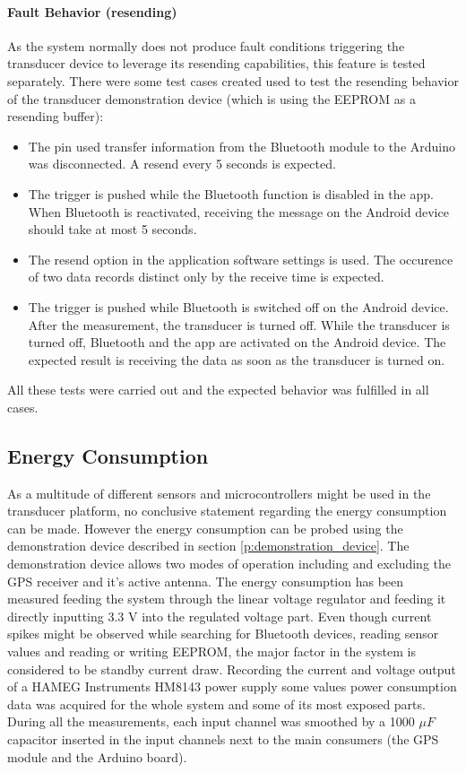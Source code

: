\paragraph{Fault Behavior (resending)}
As the system normally does not produce fault conditions triggering the transducer device to leverage its resending capabilities, this feature is tested separately. There were some test cases created used to test the resending behavior of the transducer demonstration device (which is using the EEPROM as a resending buffer):
\begin{itemize}
\item The pin used transfer information from the Bluetooth module to the Arduino was disconnected. A resend every 5 seconds is expected.
\item The trigger is pushed while the Bluetooth function is disabled in the app. When Bluetooth is reactivated, receiving the message on the Android device should take at most 5 seconds.
\item The resend option in the application software settings is used. The occurence of two data records distinct only by the receive time is expected.
\item The trigger is pushed while Bluetooth is switched off on the Android device. After the measurement, the transducer is turned off. While the transducer is turned off, Bluetooth and the app are activated on the Android device. The expected result is receiving the data as soon as the transducer is turned on.
\end{itemize}

All these tests were carried out and the expected behavior was fulfilled in all cases.

\subsection{Energy Consumption}
As a multitude of different sensors and microcontrollers might be used in the transducer platform, no conclusive statement regarding the energy consumption can be made. However the energy consumption can be probed using the demonstration device described in section \ref{p:demonstration_device}. The demonstration device allows two modes of operation including and excluding the GPS receiver and it's active antenna. The energy consumption has been measured feeding the system through the linear voltage regulator and feeding it directly inputting 3.3 V into the regulated voltage part. Even though current spikes might be observed while searching for Bluetooth devices, reading sensor values and reading or writing EEPROM, the major factor in the system is considered to be standby current draw. Recording the current and voltage output of a HAMEG Instruments HM8143 power supply some values power consumption data was acquired for the whole system and some of its most exposed parts. During all the measurements, each input channel was smoothed by a 1000 $\mu F$ capacitor inserted in the input channels next to the main consumers (the GPS module and the Arduino board).

